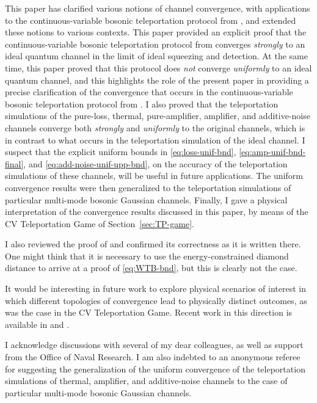 \documentclass[apsrev,twocolumn]{revtex4-1}%
\begin{document}
This paper has clarified various notions of channel convergence, with
applications to the continuous-variable bosonic teleportation protocol from
\cite{prl1998braunstein}, and extended these notions to various contexts. This
paper provided an explicit proof that the continuous-variable bosonic
teleportation protocol from \cite{prl1998braunstein} converges
\textit{strongly} to an ideal quantum channel in the limit of ideal squeezing
and detection. At the same time, this paper proved that this protocol does
\textit{not} converge \textit{uniformly} to an ideal quantum channel, and this
highlights the role of the present paper in providing a precise clarification
of the convergence that occurs in the continuous-variable bosonic
teleportation protocol from \cite{prl1998braunstein}. I also proved that the
teleportation simulations of the pure-loss, thermal, pure-amplifier,
amplifier, and additive-noise channels converge both \textit{strongly} and
\textit{uniformly} to the original channels, which is in contrast to what
occurs in the teleportation simulation of the ideal channel. I suspect that
the explicit uniform bounds in \eqref{eq:loss-unif-bnd},
\eqref{eq:amp-unif-bnd-final}, and \eqref{eq:add-noise-unif-upp-bnd}, on the
accuracy of the teleportation simulations of these channels, will be useful in
future applications. The uniform convergence results were then generalized to the teleportation simulations of particular multi-mode bosonic Gaussian channels. Finally, I gave a physical interpretation of the
convergence results discussed in this paper, by means of the CV Teleportation
Game of Section~\ref{sec:TP-game}.

I also reviewed the proof of \cite[Theorem~24]{WTB16} and confirmed its
correctness as it is written there.
One might think that it is necessary to use the energy-constrained diamond
distance to arrive at a proof of \eqref{eq:WTB-bnd}, but this is clearly not
the case.

It would be interesting in future work to explore physical scenarios of
interest in which different topologies of convergence lead to physically
distinct outcomes, as was the case in the CV Teleportation Game. Recent work
in this direction is available in \cite{Sh17a} and \cite{Win17}.

\begin{acknowledgments}
I acknowledge discussions with several of my dear colleagues, as well as
support from the Office of Naval Research. I am also indebted to an anonymous referee for suggesting the generalization of the uniform convergence of the teleportation simulations of thermal, amplifier, and additive-noise channels to the case of particular multi-mode bosonic Gaussian channels.
\end{acknowledgments}



\end{document}
